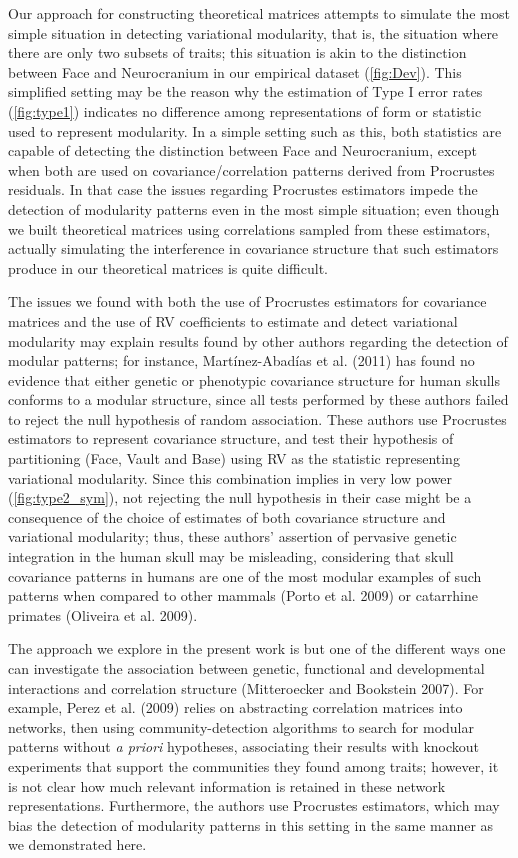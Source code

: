 \documentclass[12pt,]{article}
\begin{document}
Our approach for constructing theoretical matrices attempts to simulate
the most simple situation in detecting variational modularity, that is,
the situation where there are only two subsets of traits; this situation
is akin to the distinction between Face and Neurocranium in our
empirical dataset (\autoref{fig:Dev}). This simplified setting may be
the reason why the estimation of Type I error rates
(\autoref{fig:type1}) indicates no difference among representations of
form or statistic used to represent modularity. In a simple setting such
as this, both statistics are capable of detecting the distinction
between Face and Neurocranium, except when both are used on
covariance/correlation patterns derived from Procrustes residuals. In
that case the issues regarding Procrustes estimators impede the
detection of modularity patterns even in the most simple situation; even
though we built theoretical matrices using correlations sampled from
these estimators, actually simulating the interference in covariance
structure that such estimators produce in our theoretical matrices is
quite difficult.

The issues we found with both the use of Procrustes estimators for
covariance matrices and the use of RV coefficients to estimate and
detect variational modularity may explain results found by other authors
regarding the detection of modular patterns; for instance,
Martínez-Abadías et al. (2011) has found no evidence that either genetic
or phenotypic covariance structure for human skulls conforms to a
modular structure, since all tests performed by these authors failed to
reject the null hypothesis of random association. These authors use
Procrustes estimators to represent covariance structure, and test their
hypothesis of partitioning (Face, Vault and Base) using RV as the
statistic representing variational modularity. Since this combination
implies in very low power (\autoref{fig:type2_sym}), not rejecting the
null hypothesis in their case might be a consequence of the choice of
estimates of both covariance structure and variational modularity; thus,
these authors' assertion of pervasive genetic integration in the human
skull may be misleading, considering that skull covariance patterns in
humans are one of the most modular examples of such patterns when
compared to other mammals (Porto et al. 2009) or catarrhine primates
(Oliveira et al. 2009).

The approach we explore in the present work is but one of the different
ways one can investigate the association between genetic, functional and
developmental interactions and correlation structure (Mitteroecker and
Bookstein 2007). For example, Perez et al. (2009) relies on abstracting
correlation matrices into networks, then using community-detection
algorithms to search for modular patterns without \emph{a priori}
hypotheses, associating their results with knockout experiments that
support the communities they found among traits; however, it is not
clear how much relevant information is retained in these network
representations. Furthermore, the authors use Procrustes estimators,
which may bias the detection of modularity patterns in this setting in
the same manner as we demonstrated here.
\end{document}
